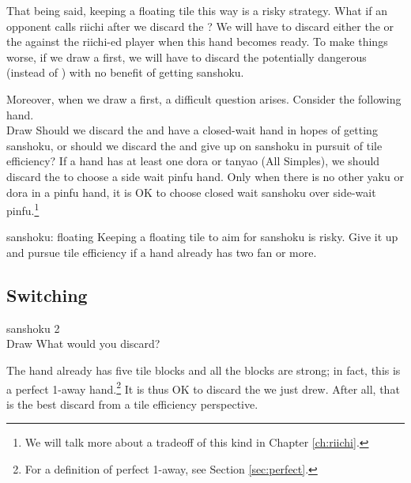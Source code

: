 \bigskip
That being said, keeping a floating tile this way is a risky strategy. What if an opponent calls {\jap riichi} after we discard the {\large\bei}? We will have to discard either the {\large{}} or the {\large{}} against the {\jap riichi}-ed player when this hand becomes ready. To make things worse, if we draw a {\large{}} first, we will have to discard the potentially dangerous {\large{}} (instead of {\large\bei}) with no benefit of getting {\jap sanshoku}. 

\bigskip
Moreover, when we draw a {\large{}} first, a difficult question arises. Consider the following hand. 
\bp
{}~\\
\hspace{290pt}\footnotesize{Draw}
\ep
Should we discard the {\large{}} and have a closed-wait hand in hopes of getting {\jap sanshoku}, or should we discard the {\large{}} and give up on {\jap sanshoku} in pursuit of tile efficiency?
If a hand has at least one {\jap dora} or {\jap tanyao} (All Simples), we should discard the {\large{}} to choose a side wait {\jap pinfu} hand. Only when there is no other {\jap yaku} or {\jap dora} in a {\jap pinfu} hand, it is OK to choose closed wait {\jap sanshoku} over side-wait {\jap pinfu}.\footnote{We will talk more about a tradeoff of this kind in Chapter \ref{ch:riichi}.}
\\

\vfill
\begin{itembox}[c]{{\jap sanshoku}: floating}
Keeping a floating tile to aim for {\jap sanshoku} is risky. Give it up and pursue tile efficiency if a hand already has two {\jap fan} or more.
\end{itembox}
\clearpage

\newpage
\subsection{Switching} \label{sec:san2}

\begin{itembox}[r]{{\jap sanshoku} 2}
\bp
{}~\\
\hspace{290pt}\footnotesize{Draw}
\ep
\vspace{-17pt}What would you discard? \vspace{-5pt}
\end{itembox}
\noindent
The hand already has five tile blocks and all the blocks are strong; in fact, this is a perfect 1-away hand.\footnote{For a definition of perfect 1-away, see Section \ref{sec:perfect}.} It is thus OK to discard the {\large{}} we just drew. After all, that is the best discard from a tile efficiency perspective. 

